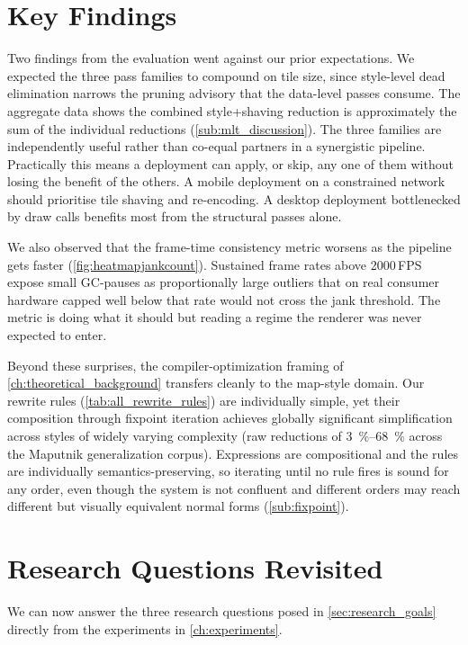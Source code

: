 \section{Key Findings}

Two findings from the evaluation went against our prior expectations.
We expected the three pass families to compound on tile size, since style-level dead elimination narrows the pruning advisory that the data-level passes consume.
The aggregate data shows the combined style+shaving reduction is approximately the sum of the individual reductions (\cref{sub:mlt_discussion}).
The three families are independently useful rather than co-equal partners in a synergistic pipeline.
Practically this means a deployment can apply, or skip, any one of them without losing the benefit of the others.
A mobile deployment on a constrained network should prioritise tile shaving and re-encoding.
A desktop deployment bottlenecked by draw calls benefits most from the structural passes alone.

We also observed that the frame-time consistency metric worsens as the pipeline gets faster (\cref{fig:heatmapjankcount}).
Sustained frame rates above 2000\,\ac{FPS} expose small \ac{GC}-pauses as proportionally large outliers that on real consumer hardware capped well below that rate would not cross the jank threshold.
The metric is doing what it should but reading a regime the renderer was never expected to enter.

Beyond these surprises, the compiler-optimization framing of \cref{ch:theoretical_background} transfers cleanly to the map-style domain.
Our rewrite rules (\cref{tab:all_rewrite_rules}) are individually simple, yet their composition through fixpoint iteration achieves globally significant simplification across styles of widely varying complexity (raw reductions of \qtyrange{3}{68}{\percent} across the Maputnik generalization corpus).
Expressions are compositional and the rules are individually semantics-preserving, so iterating until no rule fires is sound for any order, even though the system is not confluent and different orders may reach different but visually equivalent normal forms (\cref{sub:fixpoint}).

\section{Research Questions Revisited}\label{sec:rq_revisited}

We can now answer the three research questions posed in \cref{sec:research_goals} directly from the experiments in \cref{ch:experiments}.

